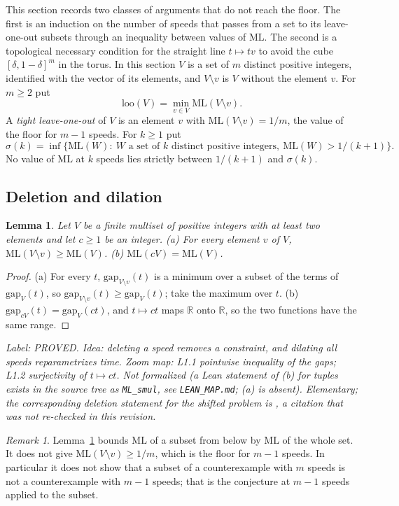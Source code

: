 \documentclass[11pt]{article}
\newtheorem{lemma}[theorem]{Lemma}
\theoremstyle{remark}
\newtheorem{remark}[theorem]{Remark}
\newcommand{\ML}{\mathrm{ML}}
\newcommand{\gap}{\mathrm{gap}}
\newcommand{\loo}{\mathrm{loo}}
\newcommand{\R}{\mathbb{R}}
\newcommand{\lab}[1]{\par\smallskip\noindent\textit{Label: #1.}}
\begin{document}
This section records two classes of arguments that do not reach the floor. The first is an induction on the number of speeds that passes from a set to its leave-one-out subsets through an inequality between values of $\ML$. The second is a topological necessary condition for the straight line $t\mapsto tv$ to avoid the cube $[\delta,1-\delta]^m$ in the torus. In this section $V$ is a set of $m$ distinct positive integers, identified with the vector of its elements, and $V\setminus v$ is $V$ without the element $v$. For $m\ge2$ put
\[\loo(V)=\min_{v\in V}\ML(V\setminus v).\]
A \emph{tight leave-one-out} of $V$ is an element $v$ with $\ML(V\setminus v)=1/m$, the value of the floor for $m-1$ speeds. For $k\ge1$ put
\[\sigma(k)=\inf\{\ML(W):\ W\text{ a set of }k\text{ distinct positive integers},\ \ML(W)>1/(k+1)\}.\]
No value of $\ML$ at $k$ speeds lies strictly between $1/(k+1)$ and $\sigma(k)$.

\subsection{Deletion and dilation}

\begin{lemma}\label{lem:D0}
Let $V$ be a finite multiset of positive integers with at least two elements and let $c\ge1$ be an integer. (a) For every element $v$ of $V$, $\ML(V\setminus v)\ge\ML(V)$. (b) $\ML(cV)=\ML(V)$.
\end{lemma}
\begin{proof}
(a) For every $t$, $\gap_{V\setminus v}(t)$ is a minimum over a subset of the terms of $\gap_V(t)$, so $\gap_{V\setminus v}(t)\ge\gap_V(t)$; take the maximum over $t$. (b) $\gap_{cV}(t)=\gap_V(ct)$, and $t\mapsto ct$ maps $\R$ onto $\R$, so the two functions have the same range.
\end{proof}
\lab{PROVED. Idea: deleting a speed removes a constraint, and dilating all speeds reparametrizes time. Zoom map: L1.1 pointwise inequality of the gaps; L1.2 surjectivity of $t\mapsto ct$. Not formalized (a Lean statement of (b) for tuples exists in the source tree as \texttt{ML\_smul}, see \texttt{LEAN\_MAP.md}; (a) is absent). Elementary; the corresponding deletion statement for the shifted problem is \cite[Lemma~7.14]{Zhang26}, a citation that was not re-checked in this revision}

\begin{remark}\label{rem:D0}
Lemma~\ref{lem:D0} bounds $\ML$ of a subset from below by $\ML$ of the whole set. It does not give $\ML(V\setminus v)\ge1/m$, which is the floor for $m-1$ speeds. In particular it does not show that a subset of a counterexample with $m$ speeds is not a counterexample with $m-1$ speeds; that is the conjecture at $m-1$ speeds applied to the subset.
\end{remark}
\end{document}
